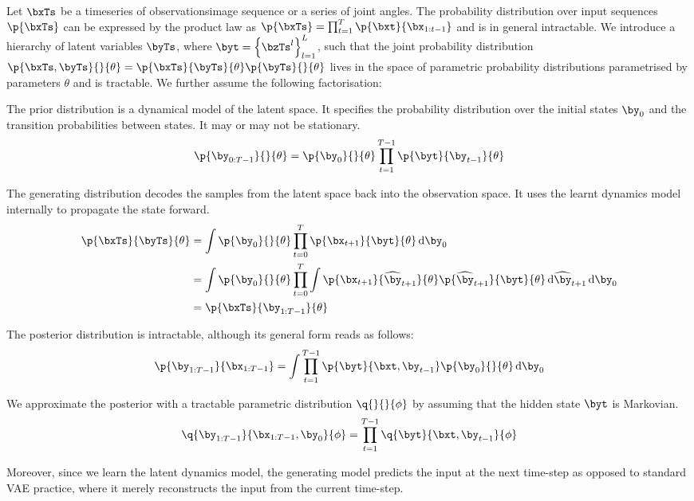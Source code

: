 \documentclass[]{article}
\begin{document}
	Let $\bxTs$ be a timeseries of observations\eg image sequence or a series of joint angles. The probability distribution over input sequences $\p{\bxTs}$ can be expressed by the product law as $\p{\bxTs}= \prod_{t=1}^T \p{\bxt}{\bx_{1:t-1}}$ and is in general intractable. We introduce a hierarchy of latent variables $\byTs$, where $\byt = \set{ \bzTs^l }_{l=1}^L$, such that the joint probability distribution $\p{\bxTs, \byTs}{}{\theta} = \p{\bxTs}{\byTs}{\theta}\p{\byTs}{}{\theta}$ lives in the space of parametric probability distributions parametrised by parameters $\theta$ and is tractable. We further assume the following factorisation:
	\begin{description}[leftmargin=\parindent]
		\item[prior] The prior distribution is a dynamical model of the latent space. It specifies the probability distribution over the initial states $\by_0$ and the transition probabilities between states. It may or may not be stationary.
		\begin{equation}
		\p{\by_{0:T-1}}{}{\theta} = \p{\by_0}{}{\theta} \prod_{t=1}^{T-1} \p{\byt}{\by_{t-1}}{\theta}
		\end{equation}
		
		\item[generating distribution] The generating distribution decodes the samples from the latent space back into the observation space. It uses the learnt dynamics model internally to propagate the state forward.
		\begin{equation}
			\begin{aligned}
				\p{\bxTs}{\byTs}{\theta} &= \int \p{\by_0}{}{\theta} \prod_{t=0}^T \p{\bx_{t+1}}{\byt}{\theta}\dint \by_0 \\
				&= \int \p{\by_0}{}{\theta} \prod_{t=0}^T \int \p{\bx_{t+1}}{\widehat{\by}_{t+1}}{\theta} \p{\widehat{\by}_{t+1}}{\byt}{\theta} \dint \widehat{\by}_{t+1} \dint \by_0 \\
				&= \p{\bxTs}{\by_{1:T-1}}{\theta}
			\end{aligned}
		\end{equation}
	
		\item[posterior distribution] The posterior distribution is intractable, although its general form reads as follows:
		\begin{equation}
			\p{\by_{1:T-1}}{\bx_{1:T-1}} = \int \prod_{t=1}^{T-1} \p{\byt}{\bxt, \by_{t-1}} \p{\by_0}{}{\theta} \dint \by_0
		\end{equation}
		
		\item[approximate posterior] We approximate the posterior with a tractable parametric distribution $\q{}{}{\phi}$ by assuming that the hidden state $\byt$ is Markovian.
		\begin{equation}
			\q{\by_{1:T-1}}{\bx_{1:T-1}, \by_0}{\phi} = \prod_{t=1}^{T-1} \q{\byt}{\bxt, \by_{t-1}}{\phi}
		\end{equation}
	\end{description}
	Moreover, since we learn the latent dynamics model, the generating model predicts the input at the next time-step as opposed to standard VAE practice, where it merely reconstructs the input from the current time-step.
	
\end{document}
